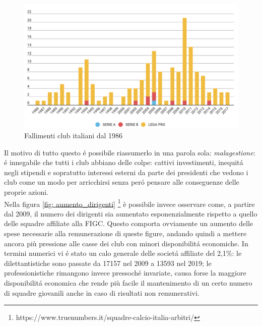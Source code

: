 \documentclass[
    corpo=11.5pt,
    oneside,
    evenboxes,
    tipotesi=triennale,
    stile=classica,
    oldstyle,
    autoretitolo,
    greek,
]{toptesi}
\begin{document}
\begin{interlinea}{1.5}
\begin{figure}
    \includegraphics[scale=0.6]{img/grafico_fallimenti.png}
    \caption{Fallimenti club italiani dal 1986}
    \label{fig: grafico_fallimenti}
\end{figure}

Il motivo di tutto questo \'e possibile riassumerlo in una parola sola: \emph{malagestione}:
\'e innegabile che tutti i club abbiano delle colpe: cattivi investimenti, inequit\'a negli stipendi 
e sopratutto interessi esterni da parte dei presidenti che vedono i club come un modo per arricchirsi senza per\'o 
pensare alle conseguenze delle proprie azioni.\\
Nella figura \ref{fig: aumento_dirigenti} \footnote{https://www.truenumbers.it/squadre-calcio-italia-arbitri/} è possibile invece 
osservare come, a partire dal 2009, il numero dei dirigenti sia aumentato esponenzialmente 
rispetto a quello delle squadre affiliate alla FIGC. Questo comporta ovviamente un aumento delle spese necessarie alla remunerazione
di queste figure, andando quindi a mettere ancora più pressione alle casse dei club con minori disponibilit\'a economiche. 
In termini numerici vi \'e stato un calo generale delle societ\'a affiliate del 2,1\%: le dilettantistiche sono passate da 17157 
nel 2009 a 13593 nel 2019; le professionistiche rimangono invece pressoch\'e invariate, causa forse la maggiore disponibilit\'a 
economica che rende più facile il mantenimento di un certo numero di squadre giovanili anche in caso di risultati non remunerativi. 


\end{interlinea}
\end{document}
